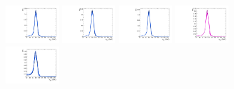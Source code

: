 \begin{figure}[htbp]
  \centering
  \includegraphics[width=0.18\textwidth]{fig/2Dfit/templateSignalVsMX_fromDC_VBFGbuToWW_MJJ_mu_HP_nobb_LDy.pdf}
  \includegraphics[width=0.18\textwidth]{fig/2Dfit/templateSignalVsMX_fromDC_VBFRadToWW_MJJ_mu_HP_nobb_LDy.pdf}
  \includegraphics[width=0.18\textwidth]{fig/2Dfit/templateSignalVsMX_fromDC_VBFZprToWW_MJJ_mu_HP_nobb_LDy.pdf}
  \includegraphics[width=0.18\textwidth]{fig/2Dfit/templateSignalVsMX_fromDC_VBFWprToWZ_MJJ_mu_HP_nobb_LDy.pdf}\\
  \includegraphics[width=0.18\textwidth]{fig/2Dfit/templateSignalVsMX_fromDC_VBFGbuToWW_MJJ_mu_LP_nobb_LDy.pdf}

\end{figure}
